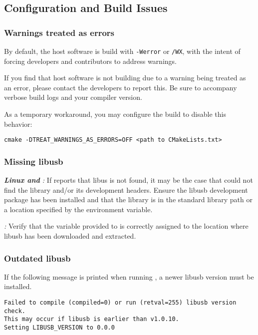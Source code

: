 \subsection{Configuration and Build Issues}

\subsubsection{Warnings treated as errors}

By default, the host software is build with \texttt{-Werror} or \texttt{/WX},
with the intent of forcing developers and contributors to address warnings.

If you find that host software is not building due to a warning being treated
as an error, please contact the \bladerf developers to report this. Be sure
to accompany verbose build logs and your compiler version.

As a temporary workaround, you may configure the build to disable this behavior:
\begin{lstlisting}[style=snippet]
    cmake -DTREAT_WARNINGS_AS_ERRORS=OFF <path to CMakeLists.txt>
\end{lstlisting}

\subsubsection{Missing libusb}

\textit{\textbf{Linux and \osx}:}
If \cmake reports that libus is not found, it may be the case that
 could not find the library and/or its development headers.
Ensure the libusb development package has been installed and that the library
is in the standard library path or a location specified by the
 environment variable.

\textit{\textbf{\windows}:}
Verify that the  variable provided to \cmake is correctly assigned to
the location where libusb has been downloaded and extracted.

\subsubsection{Outdated libusb}

If the following message is printed when running \cmake, a newer libusb version
must be installed.

\begin{lstlisting}[style=snippet]
Failed to compile (compiled=0) or run (retval=255) libusb version check.
This may occur if libusb is earlier than v1.0.10.
Setting LIBUSB_VERSION to 0.0.0
\end{lstlisting}

